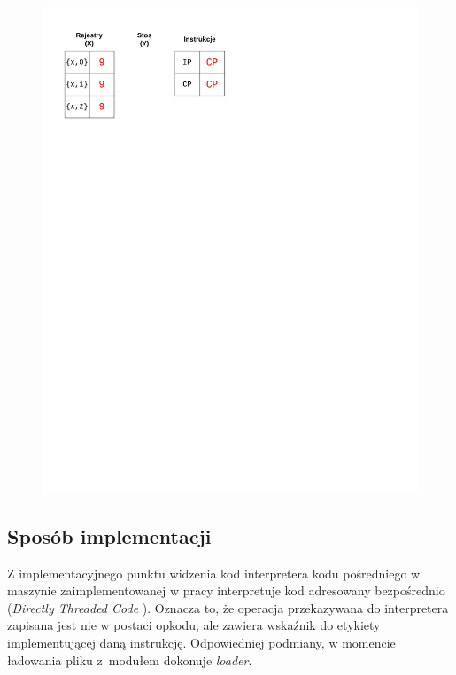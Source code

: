 \begin{figure}
\begin{multicols}{2}
\vspace{-4mm}
\begin{Figure}
 \centering
 \includegraphics[scale=0.65, clip, trim=10mm 215mm 110mm 10mm]{interpreter_max_8}
\label{fig:max8}
\end{Figure}
\end{multicols}
\end{figure}

\subsection{Sposób implementacji}
\label{sub:interpreterImplementacja}

Z implementacyjnego punktu widzenia kod interpretera kodu pośredniego w maszynie zaimplementowanej w pracy interpretuje kod adresowany bezpośrednio (\emph{Directly Threaded Code} \cite{Ertl}). Oznacza to, że operacja przekazywana do interpretera zapisana jest nie w postaci opkodu, ale zawiera wskaźnik do etykiety implementującej daną instrukcję. Odpowiedniej podmiany, w momencie ładowania pliku z~modułem dokonuje \emph{loader}.

